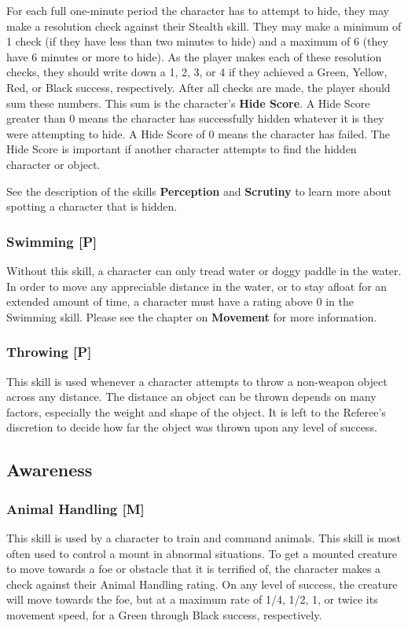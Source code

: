 \documentclass[oneside]{book}
\begin{document}
\begin{multicols}{2}
 For each full one-minute period the character has to attempt to hide, they may make a resolution check against their Stealth skill. They may make a minimum of 1 check (if they have less than two minutes to hide) and a maximum of 6 (they have 6 minutes or more to hide). As the player makes each of these resolution checks, they should write down a 1, 2, 3, or 4 if they achieved a Green, Yellow, Red, or Black success, respectively. After all checks are made, the player should sum these numbers. This sum is the character's \textbf{Hide Score}. A Hide Score greater than 0 means the character has successfully hidden whatever it is they were attempting to hide. A Hide Score of 0 means the character has failed. The Hide Score is important if another character attempts to find the hidden character or object.

See the description of the skills \textbf{Perception} and \textbf{Scrutiny} to learn more about spotting a character that is hidden. 

\subsubsection{Swimming [P]}
Without this skill, a character can only tread water or doggy paddle in the water. In order to move any appreciable distance in the water, or to stay afloat for an extended amount of time, a character must have a rating above 0 in the Swimming skill. Please see the chapter on \textbf{Movement} for more information.

\subsubsection{Throwing [P]}
This skill is used whenever a character attempts to throw a non-weapon object across any distance. The distance an object can be thrown depends on many factors, especially the weight and shape of the object. It is left to the Referee's discretion to decide how far the object was thrown upon any level of success.

\subsection{Awareness}
\subsubsection{Animal Handling [M]}
This skill is used by a character to train and command animals. This skill is most often used to control a mount in abnormal situations. To get a mounted creature to move towards a foe or obstacle that it is terrified of, the character makes a check against their Animal Handling rating. On any level of success, the creature will move towards the foe, but at a maximum rate of 1/4, 1/2, 1, or twice its movement speed, for a Green through Black success, respectively.


\end{multicols}
\end{document}
